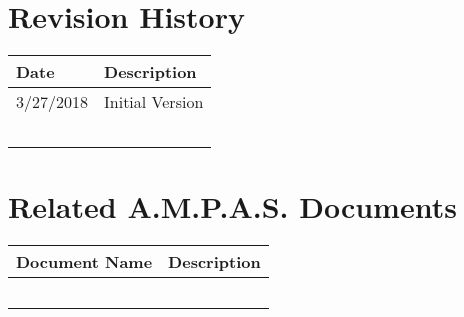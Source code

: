 \prelimsectionformat	%
\chapter{Revision History}

\begin{tabularx}{\linewidth}{|l|X|}
    \hline
    Date    & Description \\ \hline
    3/27/2018 & Initial Version \\ \hline
    &   \\ \hline
    &   \\ \hline
    &   \\ \hline
    &   \\ \hline
    &   \\ \hline
\end{tabularx}

\vspace{0.25in} %
\chapter{Related A.M.P.A.S. Documents} %
\begin{tabularx}{\linewidth}{|l|X|}
    \hline
    Document Name & Description \\ \hline
    & \\ \hline
    & \\ \hline
    & \\ \hline
    & \\ \hline
    & \\ \hline
\end{tabularx}